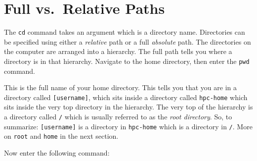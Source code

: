 \documentclass[
  letterpaper,
  DIV=11,
  numbers=noendperiod]{scrreprt}
\newenvironment{Shaded}{\begin{snugshade}}{\end{snugshade}}
\newcommand{\ExtensionTok}[1]{\textcolor[rgb]{0.00,0.23,0.31}{#1}}
\newcommand{\NormalTok}[1]{\textcolor[rgb]{0.00,0.23,0.31}{#1}}
\begin{document}
\begin{tcolorbox}[enhanced jigsaw, opacitybacktitle=0.6, colback=white, coltitle=black, opacityback=0, rightrule=.15mm, toptitle=1mm, toprule=.15mm, bottomtitle=1mm, colframe=quarto-callout-caution-color-frame, arc=.35mm, titlerule=0mm, colbacktitle=quarto-callout-caution-color!10!white, leftrule=.75mm, title={Solution}, breakable, bottomrule=.15mm, left=2mm]

\begin{Shaded}
\end{Shaded}

\end{tcolorbox}

\section{Full vs.~Relative Paths}\label{full-vs.-relative-paths}

The \texttt{cd} command takes an argument which is a directory name.
Directories can be specified using either a \emph{relative} path or a
full \emph{absolute} path. The directories on the computer are arranged
into a hierarchy. The full path tells you where a directory is in that
hierarchy. Navigate to the home directory, then enter the \texttt{pwd}
command.

\begin{Shaded}
\end{Shaded}

This is the full name of your home directory. This tells you that you
are in a directory called \texttt{{[}username{]}}, which sits inside a
directory called \texttt{hpc-home} which sits inside the very top
directory in the hierarchy. The very top of the hierarchy is a directory
called \texttt{/} which is usually referred to as the \emph{root
directory}. So, to summarize: \texttt{{[}username{]}} is a directory in
\texttt{hpc-home} which is a directory in \texttt{/}. More on
\texttt{root} and \texttt{home} in the next section.

Now enter the following command:
\end{document}
